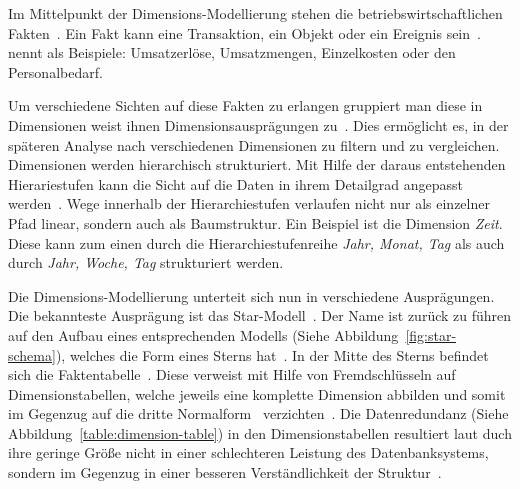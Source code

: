 \documentclass[
  language=german, %
  type=bachelor%
]{isthesis}
\begin{document}
\begin{content}
  Im Mittelpunkt der Dimensions-Modellierung stehen die
  betriebswirtschaftlichen Fakten~\cite[][S.  2]{phipps2002automating}. Ein
  Fakt kann eine Transaktion, ein Objekt oder ein Ereignis sein~\cite[][S.
  42]{ballard1998data}. \textsc{\citeauthor{Kemper2010}} nennt als Beispiele:
  \glqq{}Umsatzerlöse, Umsatzmengen, Einzelkosten oder den
  Personalbedarf\grqq{}\cite[][S. 66]{Kemper2010}. 
  
  Um verschiedene Sichten auf diese Fakten zu erlangen gruppiert man diese in
  Dimensionen \bzw{} weist ihnen Dimensionsausprägungen zu~\cite[][S.
  66]{Kemper2010}. Dies ermöglicht es, in der späteren Analyse nach
  verschiedenen Dimensionen zu filtern und zu vergleichen. Dimensionen werden
  hierarchisch strukturiert. Mit Hilfe der daraus entstehenden Hierariestufen
  kann die Sicht auf die Daten in ihrem Detailgrad angepasst werden~\cite[][S.
  66]{Kemper2010}. Wege innerhalb der Hierarchiestufen verlaufen nicht nur als
  einzelner Pfad linear, sondern auch als Baumstruktur. Ein Beispiel ist die
  Dimension \textit{Zeit}.  Diese kann zum einen durch die
  Hierarchiestufenreihe \textit{Jahr, Monat, Tag} als auch durch \textit{Jahr,
  Woche, Tag} strukturiert werden.

  Die Dimensions-Modellierung unterteit sich nun in verschiedene Ausprägungen.
  Die bekannteste Ausprägung ist das Star-Modell~\cite[][S.
  2]{phipps2002automating}. Der Name ist zurück zu f\"uhren auf den Aufbau
  eines entsprechenden Modells (Siehe Abbildung~\ref{fig:star-schema}), welches
  die Form eines Sterns hat~\cite[][S.  44]{Kimball2013}. In der Mitte des
  Sterns befindet sich die Faktentabelle~\cite[][S. 67]{Kemper2010}. Diese
  verweist mit Hilfe von Fremdschlüsseln auf Dimensionstabellen, welche jeweils
  eine komplette Dimension abbilden und somit im Gegenzug auf die dritte
  Normalform~ verzichten~\cite[][S. 67 f.]{Kemper2010}. Die
  Datenredundanz (Siehe Abbildung~\ref{table:dimension-table}) in den
  Dimensionstabellen resultiert laut \textsc{\citeauthor{Kimball2013}} duch
  ihre geringe Größe nicht in einer schlechteren Leistung des Datenbanksystems,
  sondern im Gegenzug in einer besseren Verständlichkeit der
  Struktur~\cite[][S. 15]{Kimball2013}.

  \begin{figure}[caption={Star-Schema Beispielmodell angelehnt an~\cite{Kemper2010} Abb. 2.30}, label={fig:star-schema}]
    \resizebox{\columnwidth-90pt}{!}{}
  \end{figure}


\end{content}
\end{document}
